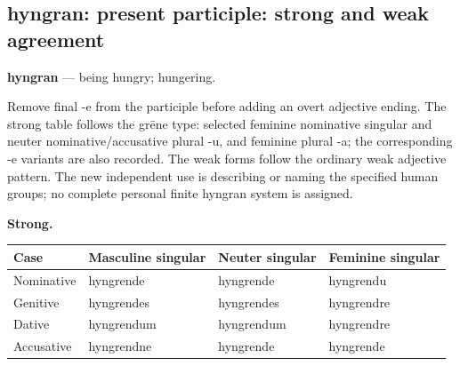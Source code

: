 \subsection*{hyngran: present participle: strong and weak agreement}

\par\begin{minipage}{\linewidth}\raggedright
\textbf{hyngran} — being hungry; hungering.

Remove final -e from the participle before adding an overt adjective ending. The strong table follows the grēne type: selected feminine nominative singular and neuter nominative/\allowbreak{}accusative plural -u, and feminine plural -a; the corresponding -e variants are also recorded. The weak forms follow the ordinary weak adjective pattern. The new independent use is describing or naming the specified human groups; no complete personal finite hyngran system is assigned.

\textbf{Strong.}

\par\begingroup
\fontsize{10.5}{13.2}\selectfont
\par\begin{minipage}{\linewidth}\raggedright
\setlength{\LTleft}{0pt}\setlength{\LTright}{\fill}
\noindent
\begin{tabular}{@{}>{\raggedright\arraybackslash}p{22mm}>{\raggedright\arraybackslash}p{31.18mm}>{\raggedright\arraybackslash}p{31.18mm}>{\raggedright\arraybackslash}p{31.18mm}@{}}
\toprule
\textbf{Case} & \textbf{Masculine singular} & \textbf{Neuter singular} & \textbf{Feminine singular} \\
\midrule
Nominative & hyngrende & hyngrende & hyngrendu \\
Genitive & hyngrendes & hyngrendes & hyngrendre \\
Dative & hyngrendum & hyngrendum & hyngrendre \\
Accusative & hyngrendne & hyngrende & hyngrende \\
\bottomrule
\end{tabular}
\end{minipage}\par
\par\endgroup
\end{minipage}\par
